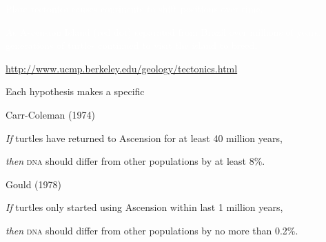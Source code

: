 \documentclass[t]{beamer}
\begin{document}
{
\begin{frame}[t]{\textcolor{white}{Plate tectonics causes continents to shift positions over time.}}
	\begin{center}
	\end{center}

	\textcolor{white}{As Ascension Island (red dot) separated from Brazil over millions of years, generations of turtles continued to visit the island to breed.}

	\vfilll

	\hfill\tiny \textcolor{white}{\url{http://www.ucmp.berkeley.edu/geology/tectonics.html}}

\end{frame}
}

\begin{frame}[t]{Each hypothesis makes a specific }
	\vspace*{-\baselineskip}


	\setlength{\columnseprule}{0.4pt}

	\begin{multicols}{2}
	
		\hangpara Carr-Coleman (1974)
	
		\hangpara \textit{If} turtles have returned to Ascension for at least 40 million years,
	
		\hangpara \textit{then} \textsc{dna} should differ from other populations by at least 8\%.
	
	\columnbreak
	
		\hangpara Gould (1978)
	
		\hangpara \textit{If} turtles only started using Ascension within last 1 million years,
	
		\hangpara \textit{then} \textsc{dna} should differ from other populations by no more than 0.2\%.	
	\end{multicols}
\end{frame}
\end{document}
